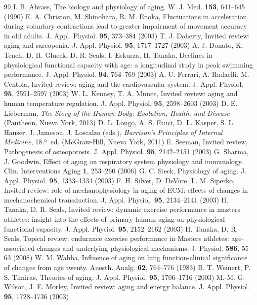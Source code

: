 \documentclass[12pt,a4paper]{book}
\begin{document}
\begin{thebibliography}{99}
 I. B. Abrass, The biology and physiology of aging. W. J. Med. \textbf{153}, 641--645 (1990)
 E. A. Christou, M. Shinohara, R. M. Enoka, Fluctuations in acceleration during voluntary contractions lead to greater impairment of movement accuracy in old adults. J. Appl. Physiol. \textbf{95}, 373--384 (2003)
 T. J. Doherty, Invited review: aging and sarcopenia. J. Appl. Physiol. \textbf{95}, 1717--1727 (2003)
 A. J. Donato, K. Tench, D. H. Glueck, D. R. Seals, I. Eskurza, H. Tanaka, Declines in physiological functional capacity with age: a longitudinal study in peak swimming performance. J. Appl. Physiol. \textbf{94}, 764--769 (2003)
 A. U. Ferrari, A. Radaelli, M. Centola, Invited review: aging and the cardiovascular system. J. Appl. Physiol. \textbf{95}, 2591--2597 (2003)
 W. L. Kenney, T. A. Munce, Invited review: aging and human temperature regulation. J. Appl. Physiol. \textbf{95}, 2598--2603 (2003)
 D. E. Lieberman, \emph{The Story of the Human Body: Evolution, Health, and Disease} (Pantheon, Nueva York, 2013)
 D. L. Longo, A. S. Fauci, D. L. Kasper, S. L. Hauser, J. Jameson, J. Loscalzo (eds.), \emph{Harrison's Principles of Internal Medicine}, 18.ª~ed. (McGraw-Hill, Nueva York, 2011)
 E. Seeman, Invited review, Pathogenesis of osteoporosis. J. Appl. Physiol. \textbf{95}, 2142--2151 (2003)
 G. Sharma, J. Goodwin, Effect of aging on respiratory system physiology and immunology. Clin. Interventions Aging \textbf{1}, 253--260 (2006)
 G. C. Sieck, Physiology of aging. J. Appl. Physiol. \textbf{95}, 1333--1334 (2003)
 F. H. Silver, D. DeVore, L. M. Siperko, Invited review: role of mechanophysiology in aging of ECM: effects of changes in mechanochemical transduction. J. Appl. Physiol. \textbf{95}, 2134--2141 (2003)
 H. Tanaka, D. R. Seals, Invited review: dynamic exercise performance in masters athletes: insight into the effects of primary human aging on physiological functional capacity. J. Appl. Physiol. \textbf{95}, 2152--2162 (2003)
 H. Tanaka, D. R. Seals, Topical review: endurance exercise performance in Masters athletes: age-associated changes and underlying physiological mechanisms. J. Physiol. \textbf{586}, 55--63 (2008)
 W. M. Wahba, Influence of aging on lung function-clinical significance of changes from age twenty. Anesth. Analg. \textbf{62}, 764--776 (1983)
 B. T. Weinert, P. S. Timiras, Theories of aging. J. Appl. Physiol. \textbf{95}, 1706--1716 (2003)
 M.-M. G. Wilson, J. E. Morley, Invited review: aging and energy balance. J. Appl. Physiol. \textbf{95}, 1728--1736 (2003)
\end{thebibliography}
\end{document}
